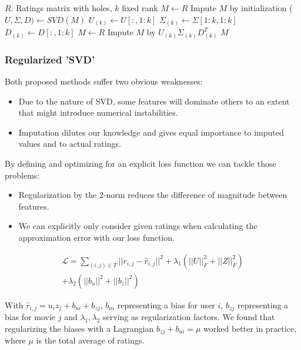 \documentclass[10pt,conference,compsocconf]{IEEEtran}
\begin{document}
\begin{algorithmic}
	\STATE $R$: Ratings matrix with holes, $k$ fixed rank
	\STATE $M \leftarrow R$
	\STATE Impute $M$ by initialization
    	\STATE ($U, \Sigma, D) \leftarrow SVD(M)$
    	\STATE $U_{(k)} \leftarrow U[:, 1:k]$
    	\STATE $\Sigma_{(k)} \leftarrow \Sigma[1:k, 1:k]$
    	\STATE $D_{(k)} \leftarrow D[:, 1:k]$
    	\STATE $M \leftarrow R$
    	\STATE Impute $M$ by $U_{(k)} \Sigma_{(k)} D_{(k)}^T$
    \ENDFOR
    \RETURN $M$
\end{algorithmic}

\subsubsection{Regularized 'SVD'}
Both proposed methods suffer two obvious weaknesses:
\begin{itemize}
\item{Due to the nature of SVD, some features will dominate others to an extent that might introduce numerical instabilities.}
\item{Imputation dilutes our knowledge and gives equal importance to imputed values and to actual ratings.}
\end{itemize}

By defining and optimizing for an explicit loss function we can tackle those problems:
\begin{itemize}
\item{Regularization by the 2-norm reduces the difference of magnitude between features.}
\item{We can explicitly only consider given ratings when calculating the approximation error with our loss function.}
\end{itemize}

\begin{equation}
\begin{split}
\mathcal{L} = \sum_{(i,j) \in T} ||r_{i,j} - \widehat{r}_{i,j}||^2 + \lambda_1 (||U||_F^2 + ||Z||_F^2) \\
+ \lambda_2(||b_u||^2 + ||b_z||^2)
\end{split}
\end{equation}

With $\widehat{r}_{i,j} = u_i z_j + b_{ui} + b_{zj}$, $b_{ui}$ representing a bias for user $i$, $b_{zj}$ representing a bias for movie $j$ and $\lambda_1, \lambda_2$ serving as regularization factors. We found that regularizing the biases with a Lagrangian $b_{zj} + b_{ui} = \mu$ worked better in practice, where $\mu$ is the total average of ratings.
\end{document}
